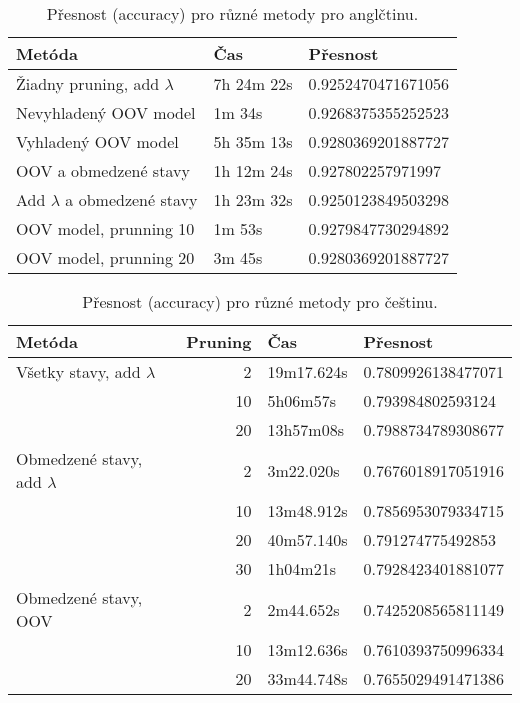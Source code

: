 \documentclass[a4paper, 10.5pt]{article}
\begin{document}
\begin{table}[H]
\centering
\begin{tabular}{lll}
\toprule
\textbf{Metóda} & \textbf{Čas} & \textbf{Přesnost} \\
\midrule
Žiadny pruning, add $\lambda$ & 7h 24m 22s  & 0.9252470471671056\\
Nevyhladený OOV model & 1m 34s & 0.9268375355252523\\
Vyhladený OOV model & 5h 35m 13s  & 0.9280369201887727\\
OOV a obmedzené stavy & 1h 12m 24s & 0.927802257971997\\
Add $\lambda$ a obmedzené stavy & 1h 23m 32s & 0.9250123849503298\\
OOV model, prunning 10 & 1m 53s & 0.9279847730294892\\
OOV model, prunning 20 & 3m 45s & 0.9280369201887727\\
\bottomrule
\end{tabular}
\caption{Přesnost (accuracy) pro různé metody pro anglčtinu.}
\label{eng_big}
\end{table}

\begin{table}[H]
\centering
\begin{tabular}{lrll}
\toprule
\textbf{Metóda} & \textbf{Pruning} & \textbf{Čas} & \textbf{Přesnost} \\
\midrule
Všetky stavy, add $\lambda$ & 2 & 19m17.624s & 0.7809926138477071\\
& 10 & 5h06m57s & 0.793984802593124\\
& 20 & 13h57m08s & 0.7988734789308677\\
\midrule
Obmedzené stavy, add $\lambda$ &2 & 3m22.020s &0.7676018917051916\\
&10& 13m48.912s& 0.7856953079334715\\
&20& 40m57.140s& 0.791274775492853\\
&30& 1h04m21s &0.7928423401881077\\
\midrule
Obmedzené stavy, OOV &2& 2m44.652s &0.7425208565811149\\
&10& 13m12.636s &0.7610393750996334\\
&20& 33m44.748s &0.7655029491471386\\
\bottomrule
\end{tabular}
\caption{Přesnost (accuracy) pro různé metody pro češtinu.}
\label{eng_big}
\end{table}
\end{document}
